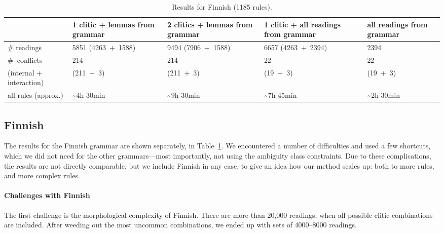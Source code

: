 {{\begin{table}[h]
\centering
\begin{tabular}{|p{3.05cm}|p{2.55cm}|p{2.55cm}|p{2.7cm}|p{2.1cm}|}

\hline
              & 1 clitic + 
                lemmas from 
                 grammar & 2 clitics 
                           + lemmas from 
                              grammar & 1 clitic +
                                          all readings 
                                          from grammar    & all readings from grammar \\ \hline
\# readings   & 5851 (4263~+~1588)
                       & 9494
                       (7906~+~1588) & 6657 (4263~+~2394) & 2394  \\ \hline
\#~conflicts  & 214    & 214         & 22                 & 22 \\
\small{(internal + 
 interaction)} & (211~+~3) & (211~+~3) & (19~+~3)        &  (19~+~3)  \\ \hline

\clock{} all 
       rules (approx.) & \~{}4h 30min     & \~{}9h 30min    & \~{}7h 45min &  \~{}2h 30min \\ \hline


\end{tabular}
\caption{Results for Finnish (1185 rules).}
\label{table:resFin}
\end{table}

\subsection{Finnish} 
\label{sec:finnishEval}

The results for the Finnish grammar are shown separately, in Table~\ref{table:resFin}. We encountered a number of difficulties and used a few shortcuts, which we did not need for the other grammars---most importantly, not using the ambiguity class constraints. Due to these complications, the results are not directly comparable, but we include Finnish in any case, 
to give an idea how our method scales up: both to more rules, and more complex rules.

\paragraph{Challenges with Finnish} The first challenge is the morphological complexity of Finnish.
There are more than 20,000 readings, when all possible clitic combinations are included.
After weeding out the most uncommon combinations, we ended up with sets of 4000--8000 readings.

}}
